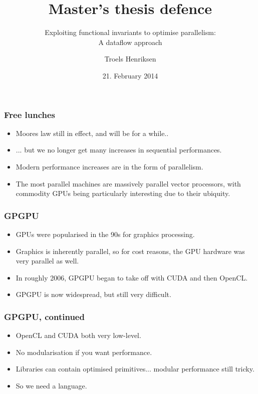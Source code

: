 \documentclass{beamer}
\title{Master's thesis defence}
\subtitle{Exploiting functional invariants to optimise parallelism:\\ A dataflow approach}
\author{Troels Henriksen}
\date{21. February 2014}
\institute{Computer Science\\
University of Copenhagen}
\begin{document}
\frame{\titlepage}


\begin{frame}
  \frametitle{Free lunches}

\begin{itemize}
\item Moores law still in effect, and will be for a while..
\item ... but we no longer get many increases in sequential
  performances.
\item Modern performance increases are in the form of parallelism.
\item The most parallel machines are massively parallel vector
  processors, with commodity GPUs being particularly interesting due
  to their ubiquity.
\end{itemize}

\end{frame}

\begin{frame}
  \frametitle{GPGPU}

\begin{itemize}
\item GPUs were popularised in the 90s for graphics processing.
\item Graphics is inherently parallel, so for cost reasons, the GPU
  hardware was very parallel as well.
\item In roughly 2006, GPGPU began to take off with CUDA and then
  OpenCL.
\item GPGPU is now widespread, but still very difficult.
\end{itemize}
\end{frame}

\begin{frame}
  \frametitle{GPGPU, continued}

\begin{itemize}
\item OpenCL and CUDA both very low-level.
\item No modularisation if you want performance.
\item Libraries can contain optimised primitives... modular
  performance still tricky.
\item So we need a language.
\end{itemize}
\end{frame}
\end{document}
